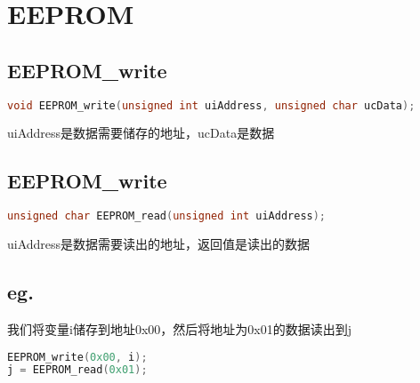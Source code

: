 \documentclass{report}
\begin{document}
\section{EEPROM}
\subsection{EEPROM\_write}
\begin{lstlisting}[language=C]
void EEPROM_write(unsigned int uiAddress, unsigned char ucData);
\end{lstlisting}
uiAddress是数据需要储存的地址，ucData是数据
\subsection{EEPROM\_write}
\begin{lstlisting}[language=C]
unsigned char EEPROM_read(unsigned int uiAddress);
\end{lstlisting}
uiAddress是数据需要读出的地址，返回值是读出的数据
\subsection{eg.}
我们将变量i储存到地址0x00，然后将地址为0x01的数据读出到j
\begin{lstlisting}[language=C]
EEPROM_write(0x00, i);
j = EEPROM_read(0x01);
\end{lstlisting}
\end{document}
